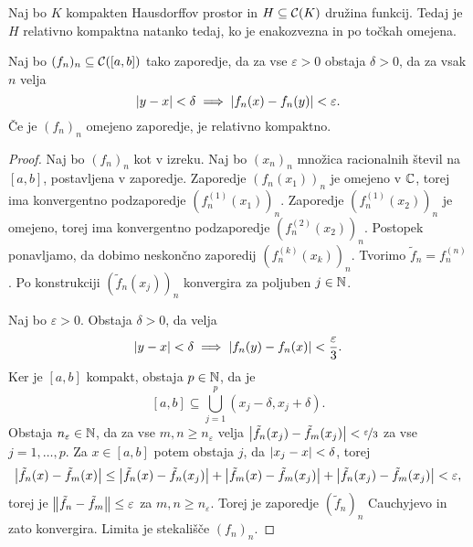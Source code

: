 \begin{izrek}
  Naj bo $K$ kompakten Hausdorffov prostor in $H \subseteq \mathcal{C}(K)$ družina
  funkcij.
  Tedaj je $H$ relativno kompaktna natanko tedaj, ko je enakozvezna in po točkah
  omejena.
\end{izrek}


\begin{izrek}
  Naj bo $(f_n)_n \subseteq \mathcal{C}([a,b])$ tako zaporedje, da za vse
  $\varepsilon > 0$ obstaja $\delta > 0$, da za vsak $n$ velja
  \[
	\left| y-x \right| < \delta \implies \left| f_n(x) - f_n(y) \right| < \varepsilon.
  \]
  Če je $(f_n)_n$ omejeno zaporedje, je relativno kompaktno.
\end{izrek}

\begin{proof}
  Naj bo $(f_n)_n$ kot v izreku.
  Naj bo $(x_n)_n$ množica racionalnih števil na $[a,b]$, postavljena v
  zaporedje.
  Zaporedje $(f_n(x_1))_n$ je omejeno v $\mathbb{C}$, torej ima konvergentno
  podzaporedje $(f_n^{(1)}(x_1))_n$.
  Zaporedje $(f_n^{(1)}(x_2))_n$ je omejeno, torej ima konvergentno podzaporedje
  $(f_n^{(2)}(x_2))_n$.
  Postopek ponavljamo, da dobimo neskončno zaporedij $(f_n^{(k)}(x_k))_n$.
  Tvorimo $\tilde{f}_n = f_n^{(n)}$.
  Po konstrukciji $(\tilde{f}_n(x_j))_n$ konvergira za poljuben $j \in \mathbb{N}$.

  Naj bo $\varepsilon > 0$.
  Obstaja $\delta > 0$, da velja
  \[
	\left| y-x \right| < \delta \implies \left| f_n(y) - f_n(x) \right| < \frac{\varepsilon}{3}.
  \]
  Ker je $[a,b]$ kompakt, obstaja $p \in \mathbb{N}$, da je
  \[
	[a,b] \subseteq \bigcup_{j=1}^p (x_j - \delta, x_j + \delta).
  \]
  Obstaja $n_\varepsilon \in \mathbb{N}$, da za vse $m,n \ge n_\varepsilon$ velja
  $\left| \tilde{f}_n(x_j) - \tilde{f}_m(x_j) \right| < \nicefrac{\varepsilon}{3}$ za vse
  $j=1, \ldots, p$.
  Za $x \in [a,b]$ potem obstaja $j$, da $\left| x_j -x \right| < \delta$, torej
  \[
	\left| \tilde{f}_n(x) - \tilde{f}_m(x) \right|
	\le \left| \tilde{f}_n(x) - \tilde{f}_n(x_j) \right| + \left| \tilde{f}_m(x) -
	  \tilde{f}_m(x_j) \right| + \left| \tilde{f}_n(x_j) - \tilde{f}_m(x_j) \right| <
	\varepsilon,
  \]
  torej je $\left\lVert\tilde{f}_n - \tilde{f}_m\right\rVert \le \varepsilon$ za $m, n \ge
  n_\varepsilon$.
  Torej je zaporedje $(\tilde{f}_n)_n$ Cauchyjevo in zato konvergira.
  Limita je stekališče $(f_n)_n$.
\end{proof}


